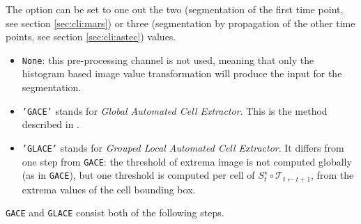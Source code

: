 The option  can be set to one out the two (segmentation of the first time point, see section \ref{sec:cli:mars}) or three (segmentation by propagation of the other time points, see section \ref{sec:cli:astec}) values.

\begin{itemize}
\itemsep -0.5ex
\item \texttt{None}: this pre-processing channel is not used, meaning that only the histogram based image value transformation will produce the input for the segmentation.
\item \texttt{'GACE'} stands for \textit{Global Automated Cell Extractor}. This is the method described in \cite{michelin:hal-00915000,michelin:tel-01451608}.
\item \texttt{'GLACE'} stands for \textit{Grouped Local Automated Cell Extractor}. It differs from one step from \texttt{GACE}: the threshold of extrema image is not computed globally (as in \texttt{GACE}), but one threshold is computed per cell of $S^{\star}_t \circ \mathcal{T}_{t \leftarrow t+1}$, from the extrema values of the cell bounding box.
\end{itemize}

\texttt{GACE} and \texttt{GLACE} consist both of the following steps.

